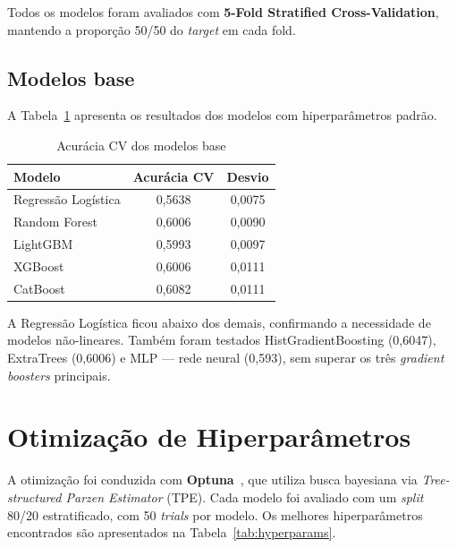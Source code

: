 \documentclass[12pt, a4paper]{article}
\begin{document}
Todos os modelos foram avaliados com \textbf{5-Fold Stratified Cross-Validation}, mantendo a proporção 50/50 do \textit{target} em cada fold.

\subsection{Modelos base}

A Tabela~\ref{tab:baselines} apresenta os resultados dos modelos com hiperparâmetros padrão.

\begin{table}[H]
  \centering
  \caption{Acurácia CV dos modelos base}
  \label{tab:baselines}
  \small{}
  \begin{tabular}{lcc}
    \toprule
    \rowcolor{headerblue}
    \color{white}\textbf{Modelo} & \color{white}\textbf{Acurácia CV} & \color{white}\textbf{Desvio} \\
    \midrule
    Regressão Logística     & 0,5638 & 0,0075 \\
    Random Forest~\cite{ref:breiman}  & 0,6006 & 0,0090 \\
    LightGBM~\cite{ref:lgbm}         & 0,5993 & 0,0097 \\
    XGBoost~\cite{ref:xgb}           & 0,6006 & 0,0111 \\
    CatBoost~\cite{ref:catboost}     & 0,6082 & 0,0111 \\
    \bottomrule
  \end{tabular}
\end{table}

A Regressão Logística ficou abaixo dos demais, confirmando a necessidade de modelos não-lineares. Também foram testados HistGradientBoosting (0,6047), ExtraTrees (0,6006) e MLP --- rede neural (0,593), sem superar os três \textit{gradient boosters} principais.

\section{Otimização de Hiperparâmetros}

A otimização foi conduzida com \textbf{Optuna}~\cite{ref:optuna}, que utiliza busca bayesiana via \textit{Tree-structured Parzen Estimator} (TPE). Cada modelo foi avaliado com um \textit{split} 80/20 estratificado, com 50 \textit{trials} por modelo. Os melhores hiperparâmetros encontrados são apresentados na Tabela~\ref{tab:hyperparams}.
\end{document}
